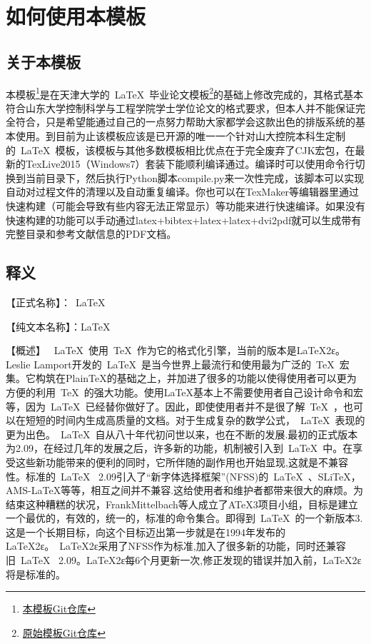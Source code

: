 \chapter{如何使用本模板}
\label{chap:howtouse}
\section{关于本模板}
本模板\footnote{\href{https://github.com/PlainSailing/SDUThesis}{本模板Git仓库}}是在天津大学的~\LaTeX{}~毕业论文模板\footnote{\href{https://github.com/xnth97/TJUThesisLatexTemplate}{原始模板Git仓库}}的基础上修改完成的，其格式基本符合山东大学控制科学与工程学院学士学位论文的格式要求，但本人并不能保证完全符合，只是希望能通过自己的一点努力帮助大家都学会这款出色的排版系统的基本使用。到目前为止该模板应该是已开源的唯一一个针对山大控院本科生定制的~\LaTeX{}~模板，该模板与其他多数模板相比优点在于完全废弃了CJK宏包，在最新的TexLive2015（Windows7）套装下能顺利编译通过。编译时可以使用命令行切换到当前目录下，然后执行Python脚本compile.py来一次性完成，该脚本可以实现自动对过程文件的清理以及自动重复编译。你也可以在TexMaker等编辑器里通过快速构建（可能会导致有些内容无法正常显示）等功能来进行快速编译。如果没有快速构建的功能可以手动通过latex+bibtex+latex+latex+dvi2pdf就可以生成带有完整目录和参考文献信息的PDF文档。
\section{释义}
【正式名称】：~\LaTeX{}~


【纯文本名称】：LaTeX


【概述】
~\LaTeX{}~使用~\TeX{}~作为它的格式化引擎，当前的版本是LaTeX2ε。Leslie Lamport开发的~\LaTeX{}~是当今世界上最流行和使用最为广泛的~\TeX{}~宏集。它构筑在PlainTeX的基础之上，并加进了很多的功能以使得使用者可以更为方便的利用~\TeX{}~的强大功能。使用LaTeX基本上不需要使用者自己设计命令和宏等，因为~\LaTeX{}~已经替你做好了。因此，即使使用者并不是很了解~\TeX{}~，也可以在短短的时间内生成高质量的文档。对于生成复杂的数学公式，~\LaTeX{}~表现的更为出色。~\LaTeX{}~自从八十年代初问世以来，也在不断的发展.最初的正式版本为2.09，在经过几年的发展之后，许多新的功能，机制被引入到~\LaTeX{}~中。在享受这些新功能带来的便利的同时，它所伴随的副作用也开始显现,这就是不兼容性。标准的~\LaTeX{}~ 2.09引入了“新字体选择框架”(NFSS)的~\LaTeX{}~、SLiTeX，AMS-LaTeX等等，相互之间并不兼容.这给使用者和维护者都带来很大的麻烦。为结束这种糟糕的状况，FrankMittelbach等人成立了ATeX3项目小组，目标是建立一个最优的，有效的，统一的，标准的命令集合。即得到~\LaTeX{}~的一个新版本3.这是一个长期目标，向这个目标迈出第一步就是在1994年发布的LaTeX2ε。~LaTeX2ε采用了NFSS作为标准,加入了很多新的功能，同时还兼容旧~\LaTeX{}~ 2.09。LaTeX2ε每6个月更新一次,修正发现的错误并加入前，LaTeX2ε将是标准的。
